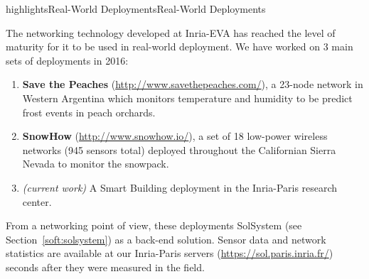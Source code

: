 \documentclass{ra2016}
\begin{document}
\begin{module}{highlights}{Real-World Deployments}{Real-World Deployments}

The networking technology developed at Inria-EVA has reached the level of maturity for it to be used in real-world deployment.
We have worked on 3 main sets of deployments in 2016:

\begin{enumerate}
    \item \textbf{Save the Peaches} (\url{http://www.savethepeaches.com/}), a 23-node network in Western Argentina which monitors temperature and humidity to be predict frost events in peach orchards.
    \item \textbf{SnowHow} (\url{http://www.snowhow.io/}), a set of 18 low-power wireless networks (945 sensors total) deployed throughout the Californian Sierra Nevada to monitor the snowpack.
    \item \textit{(current work)} A Smart Building deployment in the Inria-Paris research center.
\end{enumerate}

From a networking point of view, these deployments SolSystem (see Section~\ref{soft:solsystem}) as a back-end solution.
Sensor data and network statistics are available at our Inria-Paris servers (\url{https://sol.paris.inria.fr/}) seconds after they were measured in the field.

\end{module}
\end{document}
